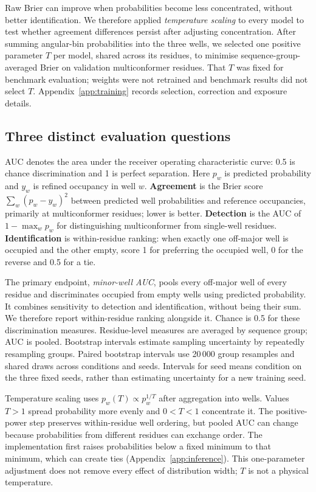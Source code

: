 \documentclass[10pt,twocolumn,a4paper]{article}
\begin{document}
Raw Brier can improve when probabilities become less concentrated, without better identification. We therefore applied \emph{temperature scaling} to every model to test whether agreement differences persist after adjusting concentration. After summing angular-bin probabilities into the three wells, we selected one positive parameter $T$ per model, shared across its residues, to minimise sequence-group-averaged Brier on validation multiconformer residues. That $T$ was fixed for benchmark evaluation; weights were not retrained and benchmark results did not select $T$. Appendix~\ref{app:training} records selection, correction and exposure details.

\subsection{Three distinct evaluation questions}
AUC denotes the area under the receiver operating characteristic curve: 0.5 is chance discrimination and 1 is perfect separation. Here $p_w$ is predicted probability and $y_w$ is refined occupancy in well $w$.
\textbf{Agreement} is the Brier score $\sum_w(p_w-y_w)^2$ between predicted well probabilities and reference occupancies, primarily at multiconformer residues; lower is better. \textbf{Detection} is the AUC of $1-\max_w p_w$ for distinguishing multiconformer from single-well residues. \textbf{Identification} is within-residue ranking: when exactly one off-major well is occupied and the other empty, score 1 for preferring the occupied well, 0 for the reverse and 0.5 for a tie.

The primary endpoint, \emph{minor-well AUC}, pools every off-major well of every residue and discriminates occupied from empty wells using predicted probability. It combines sensitivity to detection and identification, without being their sum. We therefore report within-residue ranking alongside it. Chance is 0.5 for these discrimination measures. Residue-level measures are averaged by sequence group; AUC is pooled. Bootstrap intervals estimate sampling uncertainty by repeatedly resampling groups. Paired bootstrap intervals use 20\,000 group resamples and shared draws across conditions and seeds. Intervals for seed means condition on the three fixed seeds, rather than estimating uncertainty for a new training seed.

Temperature scaling uses $p_w(T)\propto p_w^{1/T}$ after aggregation into wells. Values $T>1$ spread probability more evenly and $0<T<1$ concentrate it. The positive-power step preserves within-residue well ordering, but pooled AUC can change because probabilities from different residues can exchange order. The implementation first raises probabilities below a fixed minimum to that minimum, which can create ties (Appendix~\ref{app:inference}). This one-parameter adjustment does not remove every effect of distribution width; $T$ is not a physical temperature.
\end{document}
